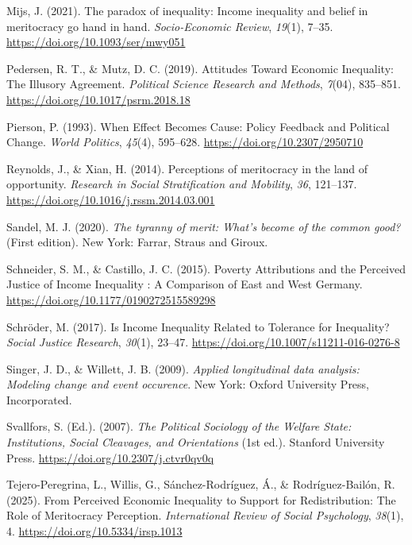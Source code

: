 \documentclass[
  12pt,
]{article}
\newlength{\cslhangindent}
\newenvironment{CSLReferences}[2] %
 {\begin{list}{}{%
  \setlength{\itemindent}{0pt}
  \setlength{\leftmargin}{0pt}
  \setlength{\parsep}{0pt}
  \ifodd #1
   \setlength{\leftmargin}{\cslhangindent}
   \setlength{\itemindent}{-1\cslhangindent}
  \fi
  \setlength{\itemsep}{#2\baselineskip}}}
 {\end{list}}
\begin{document}
\begin{CSLReferences}{1}{0}
Mijs, J. (2021). The paradox of inequality: Income inequality and belief
in meritocracy go hand in hand. \emph{Socio-Economic Review},
\emph{19}(1), 7--35. \url{https://doi.org/10.1093/ser/mwy051}

Pedersen, R. T., \& Mutz, D. C. (2019). Attitudes {Toward Economic
Inequality}: {The Illusory Agreement}. \emph{Political Science Research
and Methods}, \emph{7}(04), 835--851.
\url{https://doi.org/10.1017/psrm.2018.18}

Pierson, P. (1993). When {Effect Becomes Cause}: {Policy Feedback} and
{Political Change}. \emph{World Politics}, \emph{45}(4), 595--628.
\url{https://doi.org/10.2307/2950710}

Reynolds, J., \& Xian, H. (2014). Perceptions of meritocracy in the land
of opportunity. \emph{Research in Social Stratification and Mobility},
\emph{36}, 121--137. \url{https://doi.org/10.1016/j.rssm.2014.03.001}

Sandel, M. J. (2020). \emph{The tyranny of merit: {What}'s become of the
common good?} (First edition). New York: {Farrar, Straus and Giroux}.

Schneider, S. M., \& Castillo, J. C. (2015). Poverty {Attributions} and
the {Perceived Justice} of {Income Inequality} : {A Comparison} of
{East} and {West Germany}.
\url{https://doi.org/10.1177/0190272515589298}

Schröder, M. (2017). Is {Income Inequality Related} to {Tolerance} for
{Inequality}? \emph{Social Justice Research}, \emph{30}(1), 23--47.
\url{https://doi.org/10.1007/s11211-016-0276-8}

Singer, J. D., \& Willett, J. B. (2009). \emph{Applied longitudinal data
analysis: Modeling change and event occurence}. New York: Oxford
University Press, Incorporated.

Svallfors, S. (Ed.). (2007). \emph{The {Political Sociology} of the
{Welfare State}: {Institutions}, {Social Cleavages}, and {Orientations}}
(1st ed.). Stanford University Press.
\url{https://doi.org/10.2307/j.ctvr0qv0q}

Tejero-Peregrina, L., Willis, G., Sánchez-Rodríguez, Á., \&
Rodríguez-Bailón, R. (2025). From {Perceived Economic Inequality} to
{Support} for {Redistribution}: {The Role} of {Meritocracy Perception}.
\emph{International Review of Social Psychology}, \emph{38}(1), 4.
\url{https://doi.org/10.5334/irsp.1013}


\end{CSLReferences}
\end{document}
